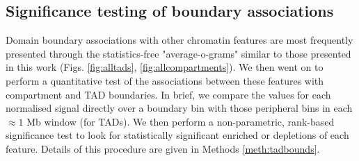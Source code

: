 \documentclass[a4paper,11pt,oneside]{book}
\begin{document}
\subsection{Significance testing of boundary associations}\label{sec:boundsignif}

Domain boundary associations with other chromatin features are most frequently presented through the statistics-free "average-o-grams" similar to those presented in this work (Figs. \ref{fig:alltads}, \ref{fig:allcompartments}). We then went on to perform a quantitative test of the associations between these features with compartment and TAD boundaries. In brief, we compare the values for each normalised signal directly over a boundary bin with those peripheral bins in each $\approx 1$ Mb window (for TADs). We then perform a non-parametric, rank-based significance test to look for statistically significant enriched or depletions of each feature. Details of this procedure are given in Methods \ref{meth:tadbounds}.
\end{document}

